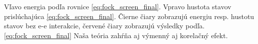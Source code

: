 \documentclass[
	11pt, %
]{beamer}
\begin{document}
\begin{frame}
\begin{figure}
    \vspace{-10mm}
    \small
    \normalsize
    \label{fig:example}%
\end{figure}
Vľavo energia podľa rovnice \eqref{eq:fock_screen_final}.  Vpravo hustota stavov prislúchajúca \eqref{eq:fock_screen_final}.
Čierne čiary zobrazujú energiu resp. hustotu stavov bez e-e interakcie, červené čiary zobrazujú výsledky podľa. \eqref{eq:fock_screen_final}
Naša teória zahŕňa aj výmenný aj korelačný efekt.
\end{frame}
\end{document}
